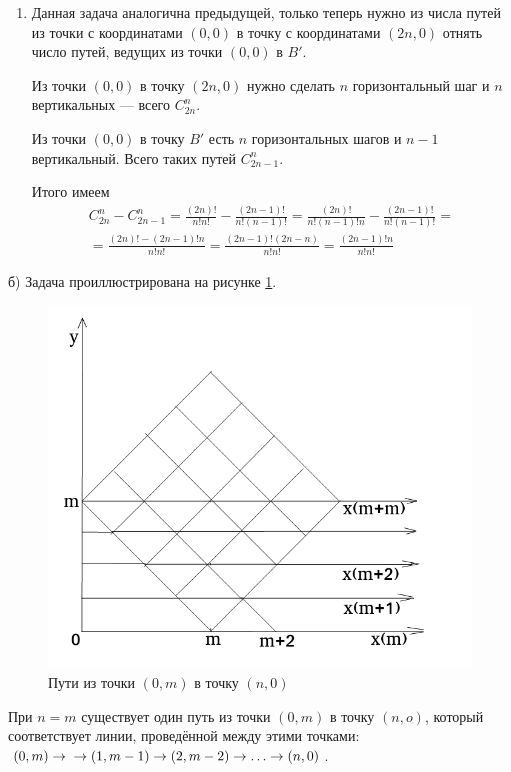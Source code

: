 \documentclass{book}
\begin{document}
\begin{enumerate}[label=(\roman*)]
\item Данная задача аналогична предыдущей, только теперь нужно из числа путей из точки с координатами
$ \left( 0, 0 \right) $ в точку с координатами $ \left( 2n, 0 \right) $ отнять число путей, ведущих из точки $ \left( 0, 0 \right) $ в $B'$.

Из точки $ \left( 0, 0 \right) $ в точку $ \left( 2n, 0 \right) $ нужно сделать $n$ горизонтальный шаг и $n$ вертикальных --- всего $C_{2n}^{n}$.

Из точки $ \left( 0, 0 \right) $ в точку $B'$ есть $n$ горизонтальных шагов и $n - 1$ вертикальный.
Всего таких путей $C_{2n-1}^n$.

Итого имеем
\begin{equation*}
\begin{split}
C_{2n}^n - C_{2n-1}^n =
\frac{ \left( 2n \right)!}{n! n!} - \frac{ \left( 2n-1 \right)!}{n! \left( n-1 \right)!} =
\frac{ \left( 2n \right)!}{n! \left( n-1 \right)! n} - \frac{ \left( 2n-1 \right)!}{n! \left( n-1 \right)!} = \\
= \frac{ \left( 2n \right)! - \left( 2n-1 \right)! n}{n! n!} =
\frac{ \left( 2n-1 \right)! \left( 2n-n \right)}{n! n!} =
\frac{ \left( 2n-1 \right)! n}{n! n!}
\end{split}
\end{equation*}
\end{enumerate}

б) Задача проиллюстрирована на рисунке \ref{fig:4222}.

\begin{figure}[h!]
  \centering
  \includegraphics[width=.6\textwidth]{./pictures/4_22_2.png}
  \caption{Пути из точки $ \left( 0, m \right) $ в точку $ \left( n, 0 \right) $}
  \label{fig:4222}
\end{figure}

При $n = m$
существует один путь из точки
$ \left( 0, m \right) $
в точку
$ \left( n, o \right)$,
который соответствует линии,
проведённой между этими точками:
$ \left( 0, m \right) \rightarrow \\
\rightarrow \left( 1, m-1 \right) \rightarrow
\left( 2, m-2 \right) \rightarrow \dotsc \rightarrow \left( n, 0 \right)$.
\end{document}
